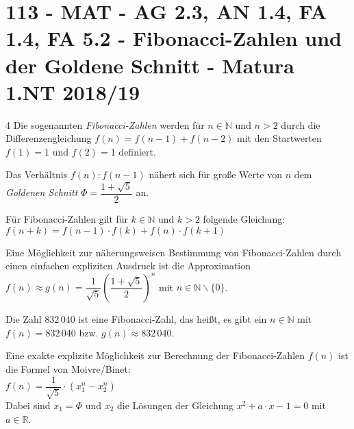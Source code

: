 \section{113 - MAT - AG 2.3, AN 1.4, FA 1.4, FA 5.2 - Fibonacci-Zahlen und der Goldene Schnitt - Matura 1.NT 2018/19}

\begin{langesbeispiel} \item[4] %
Die sogenannten \textit{Fibonacci-Zahlen} werden für $n\in\mathbb{N}$ und $n>2$ durch die Differenzengleichung $f(n)=f(n-1)+f(n-2)$ mit den Startwerten $f(1)=1$ und $f(2)=1$ definiert.

Das Verhältnis $f(n):f(n-1)$ nähert sich für große Werte von $n$ dem \textit{Goldenen Schnitt} $\Phi=\dfrac{1+\sqrt{5}}{2}$ an.%

\begin{aufgabenstellung}
\item %


Für Fibonacci-Zahlen gilt für $k\in\mathbb{N}$ und $k>2$ folgende Gleichung:\\
	$f(n+k)=f(n-1)\cdot f(k)+f(n)\cdot f(k+1)$


\item Eine Möglichkeit zur näherungsweisen Bestimmung von Fibonacci-Zahlen durch einen einfachen expliziten Ausdruck ist die Approximation\\ 
$f(n)\approx g(n)=\dfrac{1}{\sqrt{5}}\left(\dfrac{1+\sqrt{5}}{2}\right)^n$ mit $n\in\mathbb{N}\backslash\{0\}$.
	
	Die Zahl $832\,040$ ist eine Fibonacci-Zahl, das heißt, es gibt ein $n\in\mathbb{N}$ mit\\ 
	$f(n)=832\,040$ bzw. $g(n)\approx 832\,040$.%


Eine exakte explizite Möglichkeit zur Berechnung der Fibonacci-Zahlen $f(n)$ ist die Formel von Moivre/Binet:\\
	$f(n)=\dfrac{1}{\sqrt{5}}\cdot\left(x_1^n-x_2^n\right)$\\
	Dabei sind $x_1=\Phi$ und $x_2$ die Lösungen der Gleichung $x^2+a\cdot x-1=0$ mit $a\in\mathbb{R}$.


\end{aufgabenstellung}
\end{langesbeispiel}
